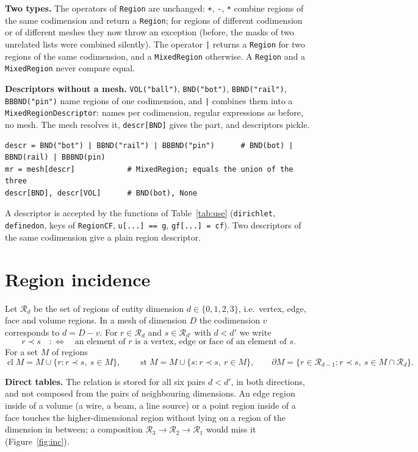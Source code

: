 \documentclass[10pt,a4paper]{article}
\newcommand{\code}[1]{\texttt{#1}}
\newcommand{\cl}{\operatorname{cl}}
\newcommand{\st}{\operatorname{st}}
\newcommand{\prerel}{\text{an element of $r$ is a vertex, edge or face of an element of $s$}}
\begin{document}
\textbf{Two types.} The operators of \code{Region} are unchanged: \code{+}, \code{-}, \code{*} combine regions of the same codimension and return a \code{Region}; for regions of different codimension or of different meshes they now throw an exception (before, the masks of two unrelated lists were combined silently). The operator \code{|} returns a \code{Region} for two regions of the same codimension, and a \code{MixedRegion} otherwise. A \code{Region} and a \code{MixedRegion} never compare equal.

\textbf{Descriptors without a mesh.} \code{VOL("ball")}, \code{BND("bot")}, \code{BBND("rail")}, \code{BBBND("pin")} name regions of one codimension, and \code{|} combines them into a \code{MixedRegionDescriptor}: names per codimension, regular expressions as before, no mesh. The mesh resolves it, \code{descr[BND]} gives the part, and descriptors pickle.
\begin{lstlisting}[numbers=none,xleftmargin=0pt]
descr = BND("bot") | BBND("rail") | BBBND("pin")      # BND(bot) | BBND(rail) | BBBND(pin)
mr = mesh[descr]            # MixedRegion; equals the union of the three
descr[BND], descr[VOL]      # BND(bot), None
\end{lstlisting}
A descriptor is accepted by the functions of Table~\ref{tab:use} (\code{dirichlet}, \code{definedon}, keys of \code{RegionCF}, \code{u[...] == g}, \code{gf[...] = cf}). Two descriptors of the same codimension give a plain region descriptor.

\section{Region incidence}\label{sec:inc}

Let $\mathcal R_d$ be the set of regions of entity dimension $d\in\{0,1,2,3\}$, i.e.\ vertex, edge, face and volume regions. In a mesh of dimension $D$ the codimension $v$ corresponds to $d = D-v$. For $r\in\mathcal R_d$ and $s\in\mathcal R_{d'}$ with $d<d'$ we write
\[
r \prec s \quad :\Longleftrightarrow\quad \prerel.
\]
For a set $M$ of regions
\[
\cl M = M\cup\{r: r\prec s,\ s\in M\},\qquad
\st M = M\cup\{s: r\prec s,\ r\in M\},\qquad
\partial M = \{r\in\mathcal R_{d-1}: r\prec s,\ s\in M\cap\mathcal R_d\}.
\]

\textbf{Direct tables.} The relation is stored for all six pairs $d<d'$, in both directions, and not composed from the pairs of neighbouring dimensions. An edge region inside of a volume (a wire, a beam, a line source) or a point region inside of a face touches the higher-dimensional region without lying on a region of the dimension in between; a composition $\mathcal R_3\to\mathcal R_2\to\mathcal R_1$ would miss it (Figure~\ref{fig:inc}).
\end{document}
